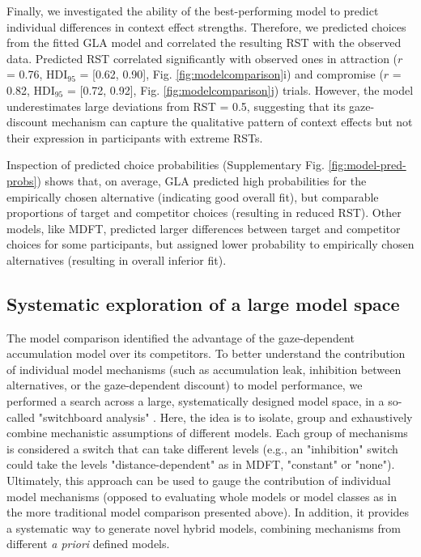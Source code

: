 \documentclass[11pt, a4paper]{article}
\begin{document}
Finally, we investigated the ability of the best-performing model to predict individual differences in context effect strengths. Therefore, we predicted choices from the fitted GLA model and correlated the resulting RST with the observed data. Predicted RST correlated significantly with observed ones in attraction ($r$ = 0.76, HDI$_{95}$ = [0.62, 0.90], Fig. \ref{fig:modelcomparison}i) and compromise ($r$ = 0.82, HDI$_{95}$ = [0.72, 0.92], Fig. \ref{fig:modelcomparison}j) trials. However, the model underestimates large deviations from RST = 0.5, suggesting that its gaze-discount mechanism can capture the qualitative pattern of context effects but not their expression in participants with extreme RSTs. 

Inspection of predicted choice probabilities (Supplementary Fig. \ref{fig:model-pred-probs}) shows that, on average, GLA predicted high probabilities for the empirically chosen alternative (indicating good overall fit), but comparable proportions of target and competitor choices (resulting in reduced RST). Other models, like MDFT, predicted larger differences between target and competitor choices for some participants, but assigned lower probability to empirically chosen alternatives (resulting in overall inferior fit).

\subsection*{Systematic exploration of a large model space}

The model comparison identified the advantage of the gaze-dependent accumulation model over its competitors. To better understand the contribution of individual model mechanisms (such as accumulation leak, inhibition between alternatives, or the gaze-dependent discount) to model performance, we performed a search across a large, systematically designed model space, in a so-called "switchboard analysis" \parencite[see][]{turner2018CompetingTheoriesMultialternative}. Here, the idea is to isolate, group and exhaustively combine mechanistic assumptions of different models. Each group of mechanisms is considered a switch that can take different levels (e.g., an "inhibition" switch could take the levels "distance-dependent" as in MDFT, "constant" or "none"). Ultimately, this approach can be used to gauge the contribution of individual model mechanisms (opposed to evaluating whole models or model classes as in the more traditional model comparison presented above). In addition, it provides a systematic way to generate novel hybrid models, combining mechanisms from different \emph{a priori} defined models.
\end{document}
